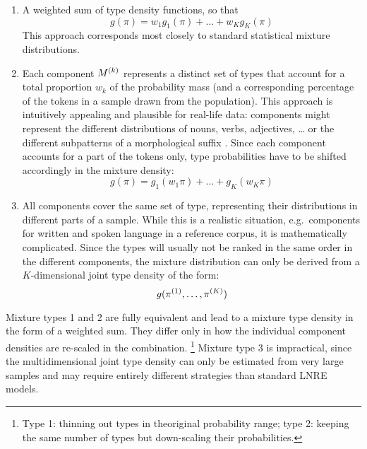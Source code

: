 \documentclass[a4paper]{article}
\begin{document}
\begin{enumerate}
\item A weighted sum of type density functions, so that
  \begin{equation}
    \label{eq:models:mixtures:type1}
    g(\pi) = w_1 g_1(\pi) + \ldots + w_K g_K(\pi)
  \end{equation}
  This approach corresponds most closely to standard statistical
  mixture distributions.
\item Each component $M^{(k)}$ represents a distinct set of types that
  account for a total proportion $w_k$ of the probability mass (and a
  corresponding percentage of the tokens in a sample drawn from the
  population). This approach is intuitively appealing and plausible for
  real-life data: components might represent the different distributions of
  nouns, verbs, adjectives, \ldots{} or the different subpatterns of a
  morphological suffix \citep[cf.][Sec.~4.3]{Baayen:01}.  Since each
  component accounts for a part of the tokens only, type probabilities have
  to be shifted accordingly in the mixture density:
  \begin{equation}
    \label{eq:models:mixtures:type2}
    g(\pi) = g_1(w_1 \pi) + \ldots + g_K(w_K \pi)
  \end{equation}
\item All components cover the same set of type, representing their
  distributions in different parts of a sample.  While this is a realistic
  situation, e.g.\ components for written and spoken language in a reference
  corpus, it is mathematically complicated. Since the types will usually
  not be ranked in the same order in the different components, the
  mixture distribution can only be derived from a $K$-dimensional joint type
  density of the form:
  \begin{equation}
    \label{eq:models:mixtures:type3}
    g(\pi^{(1)}, \ldots, \pi^{(K)})
  \end{equation}
\end{enumerate}

Mixture types 1 and 2 are fully equivalent and lead to a mixture type density
in the form of a weighted sum.  They differ only in how the individual
component densities are re-scaled in the combination.%
\footnote{Type 1: thinning out types in theoriginal probability range; type 2:
  keeping the same number of types but down-scaling their probabilities.} %
Mixture type 3 is impractical, since the multidimensional joint type density
can only be estimated from very large samples and may require entirely
different strategies than standard LNRE models.
\end{document}
